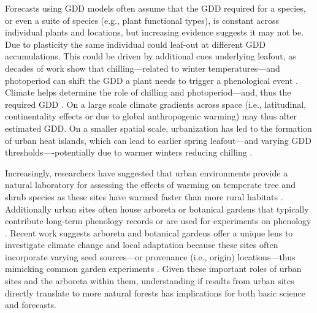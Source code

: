 \documentclass{article}\usepackage[]{graphicx}\usepackage[]{color}
\newcommand{\R}[1]{\label{#1}\linelabel{#1}}
\begin{document}
Forecasts using GDD models often assume that the GDD required for a species, or even a suite of species (e.g., plant functional types), is constant across individual plants and locations, but increasing evidence suggests it may not be. Due to plasticity the same individual could leaf-out at different GDD accumulations. This could be driven by additional cues underlying leafout, as decades of work show that chilling---related to winter temperatures---and photoperiod can shift the GDD a plant needs to trigger a phenological event \citep{Basler2012,Chuine2010,Zohner2016}. \R{Z4urban}Climate helps determine the role of chilling and photoperiod---and, thus the required GDD \citep{Bonhomme2000,Wu2022}. On a large scale climate gradients across space (i.e., latitudinal, continentality effects or due to global anthropogenic warming) may thus alter estimated GDD. On a smaller spatial scale, urbanization has led to the formation of urban heat islands, which can  lead to earlier spring leafout---and varying GDD thresholds----potentially due to warmer winters reducing chilling \citep{Meng2020}.\R{Z4urbanend}


Increasingly, researchers have suggested that urban environments provide a natural laboratory for assessing the effects of warming on temperate tree and shrub species as these sites have warmed faster than more rural habitats \citep{Grimm2008,Pickett2011}. Additionally urban sites often house arboreta or botanical gardens that typically contribute long-term phenology records \citep{Zohner2014} or are used for experiments on phenology \citep{Ettinger2018}. Recent work suggests arboreta and botanical gardens offer a unique lens to investigate climate change and local adaptation because these sites often incorporate varying seed sources---or provenance (i.e., origin) locations---thus mimicking common garden experiments \citep{Primack2009}. Given these important roles of urban sites and the arboreta within them, understanding if results from urban sites directly translate to more natural forests has implications for both basic science and forecasts.  
\end{document}
